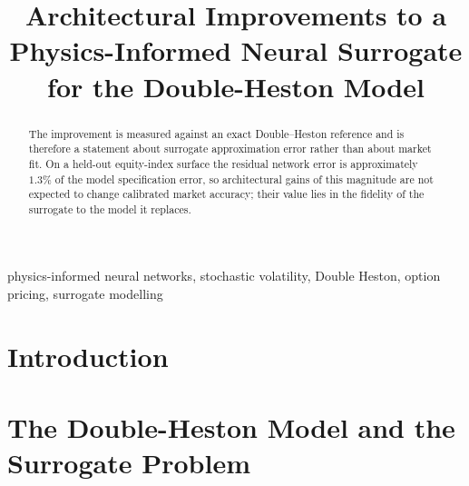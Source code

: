 \documentclass[conference]{IEEEtran}
\begin{document}
\title{Architectural Improvements to a Physics-Informed Neural Surrogate\\
for the Double-Heston Model}

\author{}

\maketitle

\begin{abstract}

The improvement is measured against an exact Double--Heston reference and is
therefore a statement about surrogate approximation error rather than about
market fit. On a held-out equity-index surface the residual network error is
approximately $1.3\%$ of the model specification error, so architectural gains
of this magnitude are not expected to change calibrated market accuracy; their
value lies in the fidelity of the surrogate to the model it replaces.
\end{abstract}

\begin{IEEEkeywords}
physics-informed neural networks, stochastic volatility, Double Heston,
option pricing, surrogate modelling
\end{IEEEkeywords}

\section{Introduction}

\section{The Double-Heston Model and the Surrogate Problem}
\end{document}
